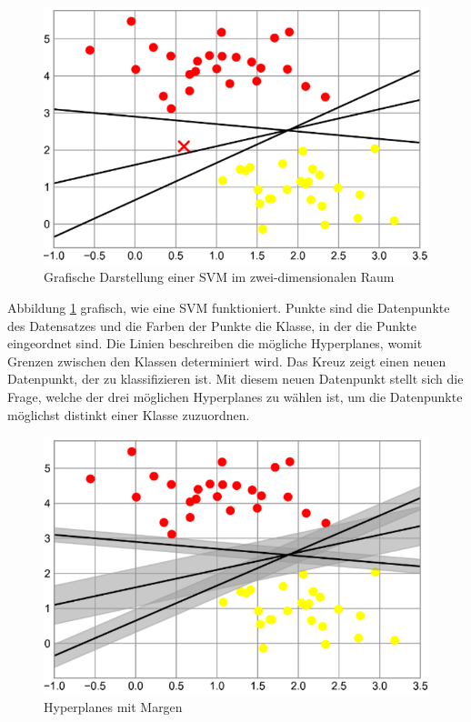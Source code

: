 \begin{figure}[h]
    \centering
    \includegraphics[scale=0.5]{figures/support_vector_new_point.png}
    \caption{Grafische Darstellung einer SVM im zwei-dimensionalen Raum}
    \label{fig:svm_graphic}
\end{figure}

Abbildung \ref{fig:svm_graphic} grafisch, wie eine SVM funktioniert. Punkte sind die Datenpunkte des Datensatzes und die Farben der Punkte die Klasse, in der die Punkte eingeordnet sind.
Die Linien beschreiben die mögliche Hyperplanes, womit Grenzen zwischen den Klassen determiniert wird. Das Kreuz zeigt einen neuen Datenpunkt, der zu klassifizieren ist. Mit diesem neuen Datenpunkt stellt sich die Frage, welche der drei möglichen Hyperplanes zu wählen ist, um die Datenpunkte möglichst distinkt einer Klasse zuzuordnen.

\pagebreak

\begin{figure}[h]
    \centering
    \includegraphics[scale=0.5]{figures/support_vector_maschine_margins.png}
    \caption{Hyperplanes mit Margen}
    \label{fig:svm_margins}
\end{figure}


